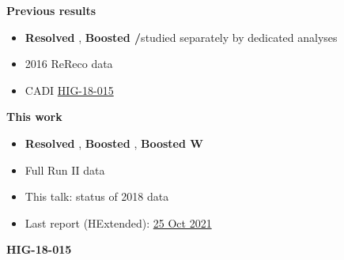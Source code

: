 {  \twoColumns
      {
        \small
        \hspace{1.5cm} \textbf{Previous results}
        \vspace{0.1cm}
        \begin{itemize}
        \item \textcolor{kDarkGreen}{\textbf{Resolved \PQt}},
          \textcolor{kBlue}{\textbf{Boosted \PW/\PQt}}\newline studied separately by dedicated analyses
        \item 2016 ReReco data
        \item CADI \href{https://cms.cern.ch/iCMS/analysisadmin/cadilines?line=HIG-18-015}{\textcolor{kBlue}{HIG-18-015}}
        \end{itemize}
      }
      {
        \small
        \hspace{2cm}  \textbf{This work}
        \vspace{0.1cm}
        \begin{itemize}          
          \item \textcolor{kDarkGreen}{\textbf{Resolved \PQt}},
            \textcolor{kBlue}{\textbf{Boosted \PQt}},  \textcolor{kBlue}{\textbf{Boosted W}}
          \item Full Run II data
          \item This talk: status of 2018 data
          \item Last report (HExtended):
            \href{https://indico.cern.ch/event/1071752/contributions/4578521/attachments/2333742/3977531/HiggsExtended_MKolosova_25Oct2021.pdf}{\textcolor{kBlue}{25
            Oct 2021}}
        \end{itemize}        
      }
}

\MySection{ }
\begin{frame}[noframenumbering]{}
  \begin{center}
    \huge \textbf{HIG-18-015}
  \end{center}
\end{frame}


